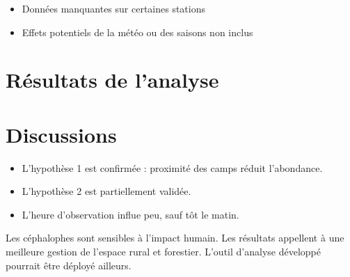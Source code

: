 \documentclass[
]{article}
\providecommand{\tightlist}{%
  \setlength{\itemsep}{0pt}\setlength{\parskip}{0pt}}
\begin{document}
\begin{itemize}
\tightlist
\item
  Données manquantes sur certaines stations
\item
  Effets potentiels de la météo ou des saisons non inclus
\end{itemize}

\section{Résultats de l'analyse}\label{ruxe9sultats-de-lanalyse-1}

\section{Discussions}\label{discussions}

\begin{itemize}
\tightlist
\item
  L'hypothèse 1 est confirmée : proximité des camps réduit l'abondance.
\item
  L'hypothèse 2 est partiellement validée.
\item
  L'heure d'observation influe peu, sauf tôt le matin.
\end{itemize}

Les céphalophes sont sensibles à l'impact humain. Les résultats appellent à une meilleure gestion de l'espace rural et forestier. L'outil d'analyse développé pourrait être déployé ailleurs.
\end{document}
